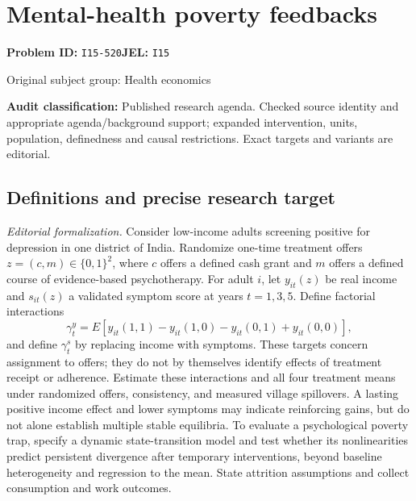 \documentclass[11pt,a4paper]{article}
\begin{document}
\section*{Mental-health poverty feedbacks}
\textbf{Problem ID:} \texttt{I15-520}\quad \textbf{JEL:} \texttt{I15}\par
\label{problem:OP-0448}
{\sffamily\small\color{muted}Original subject group: Health economics\par}
\label{definitions:problem:30007730}
\textbf{Audit classification:} Published research agenda. Checked source identity and appropriate agenda/background support; expanded intervention, units, population, definedness and causal restrictions. Exact targets and variants are editorial.
\subsection*{Definitions and precise research target}
\textit{Editorial formalization.} Consider low-income adults screening positive for depression in one district of India. Randomize one-time treatment offers \(z=(c,m)\in\{0,1\}^2\), where \(c\) offers a defined cash grant and \(m\) offers a defined course of evidence-based psychotherapy. For adult \(i\), let \(y_{it}(z)\) be real income and \(s_{it}(z)\) a validated symptom score at years \(t=1,3,5\). Define factorial interactions
\[\gamma_t^y=E[y_{it}(1,1)-y_{it}(1,0)-y_{it}(0,1)+y_{it}(0,0)],\]
and define \(\gamma_t^s\) by replacing income with symptoms. These targets concern assignment to offers; they do not by themselves identify effects of treatment receipt or adherence. Estimate these interactions and all four treatment means under randomized offers, consistency, and measured village spillovers. A lasting positive income effect and lower symptoms may indicate reinforcing gains, but do not alone establish multiple stable equilibria. To evaluate a psychological poverty trap, specify a dynamic state-transition model and test whether its nonlinearities predict persistent divergence after temporary interventions, beyond baseline heterogeneity and regression to the mean. State attrition assumptions and collect consumption and work outcomes.
\end{document}

